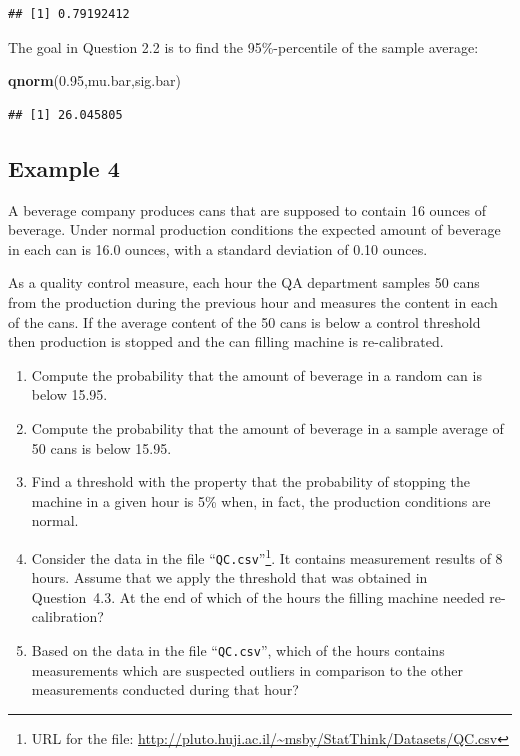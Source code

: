 \documentclass[]{krantz}
\makeatletter
\newenvironment{Shaded}{\begin{snugshade}}{\end{snugshade}}
\newcommand{\KeywordTok}[1]{\textcolor[rgb]{0.13,0.29,0.53}{\textbf{#1}}}
\newcommand{\FloatTok}[1]{\textcolor[rgb]{0.00,0.00,0.81}{#1}}
\newcommand{\NormalTok}[1]{#1}
\newenvironment{kframe}{%
\medskip{}
\setlength{\fboxsep}{.8em}
 \def\at@end@of@kframe{}%
 \ifinner\ifhmode%
  \def\at@end@of@kframe{\end{minipage}}%
  \begin{minipage}{\columnwidth}%
 \fi\fi%
 \def\FrameCommand##1{\hskip\@totalleftmargin \hskip-\fboxsep
 \colorbox{shadecolor}{##1}\hskip-\fboxsep
     \hskip-\linewidth \hskip-\@totalleftmargin \hskip\columnwidth}%
 \MakeFramed {\advance\hsize-\width
   \@totalleftmargin\z@ \linewidth\hsize
   \@setminipage}}%
 {\par\unskip\endMakeFramed%
 \at@end@of@kframe}
\renewenvironment{Shaded}{\begin{kframe}}{\end{kframe}}
\theoremstyle{definition}
\theoremstyle{definition}
\theoremstyle{definition}
\theoremstyle{remark}
\makeatother
\begin{document}
\begin{verbatim}
## [1] 0.79192412
\end{verbatim}

The goal in Question 2.2 is to find the 95\%-percentile of the sample
average:

\begin{Shaded}
\begin{Highlighting}[]
\KeywordTok{qnorm}\NormalTok{(}\FloatTok{0.95}\NormalTok{,mu.bar,sig.bar)}
\end{Highlighting}
\end{Shaded}

\begin{verbatim}
## [1] 26.045805
\end{verbatim}

\subsection{Example 4}\label{example-4}

A beverage company produces cans that are supposed to contain 16 ounces
of beverage. Under normal production conditions the expected amount of
beverage in each can is 16.0 ounces, with a standard deviation of 0.10
ounces.

As a quality control measure, each hour the QA department samples 50
cans from the production during the previous hour and measures the
content in each of the cans. If the average content of the 50 cans is
below a control threshold then production is stopped and the can filling
machine is re-calibrated.

\begin{enumerate}
\def\labelenumi{\arabic{enumi}.}
\item
  Compute the probability that the amount of beverage in a random can is
  below 15.95.
\item
  Compute the probability that the amount of beverage in a sample
  average of 50 cans is below 15.95.
\item
  Find a threshold with the property that the probability of stopping
  the machine in a given hour is 5\% when, in fact, the production
  conditions are normal.
\item
  Consider the data in the file ``\texttt{QC.csv}''\footnote{URL for the
    file: \url{http://pluto.huji.ac.il/~msby/StatThink/Datasets/QC.csv}}.
  It contains measurement results of 8 hours. Assume that we apply the
  threshold that was obtained in Question~4.3. At the end of which of
  the hours the filling machine needed re-calibration?
\item
  Based on the data in the file ``\texttt{QC.csv}'', which of the hours
  contains measurements which are suspected outliers in comparison to
  the other measurements conducted during that hour?
\end{enumerate}
\end{document}
